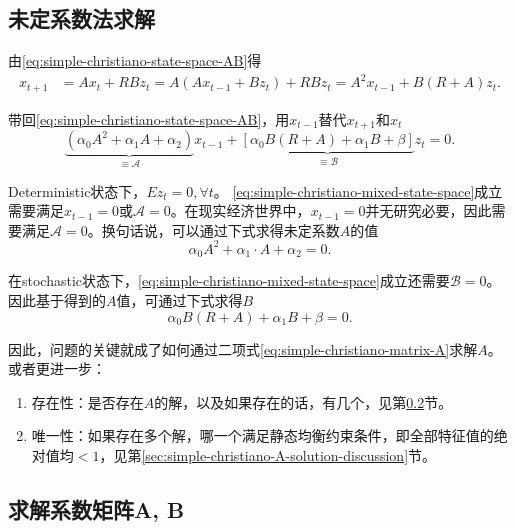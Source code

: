 \subsection{未定系数法求解}
由\eqref{eq:simple-christiano-state-space-AB}得
\begin{equation*}
  \begin{split}
    x_{t+1} &= A  x_t
 + R  B z_t  = A (A x_{t-1} + B z_t ) + R B z_t = A^2 x_{t-1} + B(R+A) z_t.
\end{split}
\end{equation*}

带回\eqref{eq:simple-christiano-state-space-AB}，用$x_{t-1}$替代$x_{t+1}$和$x_t$
\begin{equation}
  \label{eq:simple-christiano-mixed-state-space}
  \underbrace{\left(\alpha_0 A^2 + \alpha_1 A + \alpha_2 \right)}_{\equiv \mathcal{A}} x_{t-1} + \underbrace{\left[\alpha_0 B (R + A) + \alpha_1 B + \beta \right]}_{\equiv \mathcal{B}} z_t = 0.
\end{equation}

Deterministic状态下，$E z_t = 0, \forall t$。  \eqref{eq:simple-christiano-mixed-state-space}成立需要满足$x_{t-1} = 0$或$\mathcal{A} = 0$。在现实经济世界中，$x_{t-1}=0$并无研究必要，因此需要满足$\mathcal{A} = 0$。换句话说，可以通过下式求得未定系数$A$的值
\begin{equation}
  \label{eq:simple-christiano-matrix-A}
  \alpha_0 A^2 + \alpha_1 \cdot A + \alpha_2 = 0.
\end{equation}

在stochastic状态下，\eqref{eq:simple-christiano-mixed-state-space}成立还需要$\mathcal{B} = 0$。因此基于得到的$A$值，可通过下式求得$B$
\begin{equation}
  \label{eq:simple-christiano-matrix-B}
  \alpha_0 B (R + A) + \alpha_1 B + \beta = 0.
\end{equation}

因此，问题的关键就成了如何通过二项式\eqref{eq:simple-christiano-matrix-A}求解$A$。或者更进一步：
\begin{enumerate}
  \item 存在性：是否存在$A$的解，以及如果存在的话，有几个，见第\ref{sec:simple-christiano-A-solution}节。
  \item 唯一性：如果存在多个解，哪一个满足静态均衡约束条件，即全部特征值的绝对值均$<1$，见第\ref{sec:simple-christiano-A-solution-discussion}节。
\end{enumerate}

\subsection{求解系数矩阵A, B}
\label{sec:simple-christiano-A-solution}
